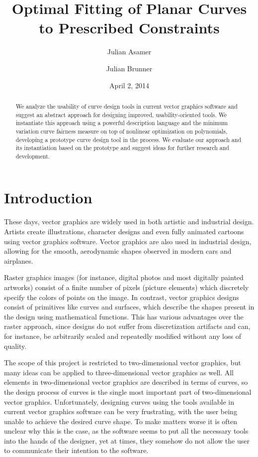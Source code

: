 \documentclass[a4paper]{article}
\title{Optimal Fitting of Planar Curves to Prescribed Constraints}
\author{Julian Asamer \and Julian Brunner}
\date{April 2, 2014}
\begin{document}
	\maketitle

	\begin{abstract}

		\noindent We analyze the usability of curve design tools in current vector graphics software and suggest an abstract approach for designing improved, usability-oriented tools. We instantiate this approach using a powerful description language and the minimum variation curve fairness measure on top of nonlinear optimization on polynomials, developing a prototype curve design tool in the process. We evaluate our approach and its instantiation based on the prototype and suggest ideas for further research and development.

	\end{abstract}

	\section{Introduction}
	\label{section:introduction}

		These days, vector graphics are widely used in both artistic and industrial design. Artists create illustrations, character designs and even fully animated cartoons using vector graphics software. Vector graphics are also used in industrial design, allowing for the smooth, aerodynamic shapes observed in modern cars and airplanes.

		Raster graphics images (for instance, digital photos and most digitally painted artworks) consist of a finite number of pixels (picture elements) which discretely specify the colors of points on the image. In contrast, vector graphics designs consist of primitives like curves and surfaces, which describe the shapes present in the design using mathematical functions. This has various advantages over the raster approach, since designs do not suffer from discretization artifacts and can, for instance, be arbitrarily scaled and repeatedly modified without any loss of quality.

		The scope of this project is restricted to two-dimensional vector graphics, but many ideas can be applied to three-dimensional vector graphics as well. All elements in two-dimensional vector graphics are described in terms of curves, so the design process of curves is the single most important part of two-dimensional vector graphics. Unfortunately, designing curves using the tools available in current vector graphics software can be very frustrating, with the user being unable to achieve the desired curve shape. To make matters worse it is often unclear why this is the case, as the software seems to put all the necessary tools into the hands of the designer, yet at times, they somehow do not allow the user to communicate their intention to the software.
\end{document}
